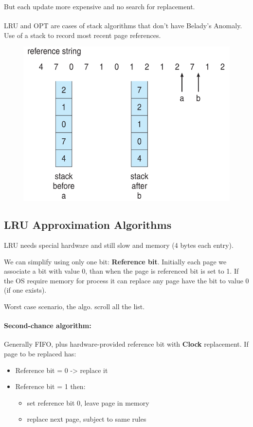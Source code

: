 But each update more expensive and no search for replacement.

\paragraph{}
LRU and OPT are cases of stack algorithms that don’t have
Belady’s Anomaly. Use of a stack to record most recent page references.


\begin{figure}[htbp]
    \centering
    \includegraphics[width=0.6\linewidth]{img/sd.png}
\end{figure}

\newpage
\subsection{LRU Approximation Algorithms}

LRU needs special hardware and still slow and memory (4 bytes each entry). 

We can simplify using only one bit: \textbf{Reference bit}. Initially each page we associate a bit with value 0, than when the page is referenced bit is set to 1. If the OS require memory for process it can replace any page have the bit to value 0 (if one exists).

Worst case scenario, the algo. scroll all the list.

\paragraph{Second-chance algorithm: } Generally FIFO, plus hardware-provided reference bit with \textbf{Clock} replacement. If page to be replaced has:

\begin{itemize}
    \item Reference bit = 0 -> replace it
    \item Reference bit = 1 then:
    \begin{itemize}
    \item[] set reference bit 0, leave page in memory
    \item[] replace next page, subject to same rules
    \end{itemize}
\end{itemize}


